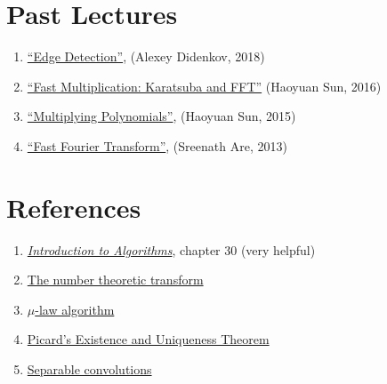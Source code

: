 \documentclass[11pt, oneside]{article}
\theoremstyle{plain}
\theoremstyle{definition}
\begin{document}
\newpage

\section{Past Lectures}
\begin{enumerate}
  \item \href{https://activities.tjhsst.edu/computervision/lectures/Edge_Detection.pdf}
    {\enquote{Edge Detection}}, (Alexey Didenkov, 2018)
  \item \href{https://activities.tjhsst.edu/sct/lectures/1516/SCT_Polynomial.pdf}
    {\enquote{Fast Multiplication: Karatsuba and FFT}} (Haoyuan Sun, 2016)
  \item \href{https://activities.tjhsst.edu/sct/lectures/1415/SCT_Multiplying_Polynomials.pdf}
    {\enquote{Multiplying Polynomials}}, (Haoyuan Sun, 2015)
  \item \href{https://activities.tjhsst.edu/sct/lectures/1213/fft.pdf}
    {\enquote{Fast Fourier Transform}}, (Sreenath Are, 2013)
\end{enumerate}

\section{References}

\begin{enumerate}
  \item \href{https://mitpress.mit.edu/books/introduction-algorithms-third-edition}
    {\textit{Introduction to Algorithms}}, chapter 30 (very helpful)
  \item \href{https://www.nayuki.io/page/number-theoretic-transform-integer-dft}
    {The number theoretic transform}
  \item \href{https://en.wikipedia.org/wiki/%CE%9C-law_algorithm}
    {\( \mu \)-law algorithm}
  \item \href{https://ptolemy.berkeley.edu/projects/embedded/eecsx44/lectures/Spring2013/Picard.pdf}
    {Picard's Existence and Uniqueness Theorem}
  \item \href{https://towardsdatascience.com/a-basic-introduction-to-separable-convolutions-b99ec3102728}
    {Separable convolutions}
\end{enumerate}

\end{document}

